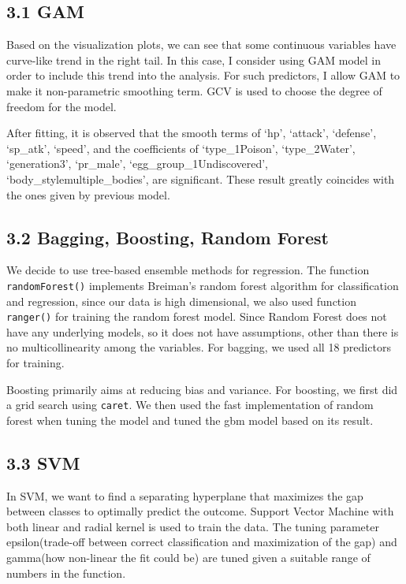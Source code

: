 \documentclass[
]{article}
\begin{document}
\hypertarget{gam}{%
\subsection{3.1 GAM}\label{gam}}

Based on the visualization plots, we can see that some continuous
variables have curve-like trend in the right tail. In this case, I
consider using GAM model in order to include this trend into the
analysis. For such predictors, I allow GAM to make it non-parametric
smoothing term. GCV is used to choose the degree of freedom for the
model.

After fitting, it is observed that the smooth terms of `hp', `attack',
`defense', `sp\_atk', `speed', and the coefficients of `type\_1Poison',
`type\_2Water', `generation3', `pr\_male', `egg\_group\_1Undiscovered',
`body\_stylemultiple\_bodies', are significant. These result greatly
coincides with the ones given by previous model.

\hypertarget{bagging-boosting-random-forest}{%
\subsection{3.2 Bagging, Boosting, Random
Forest}\label{bagging-boosting-random-forest}}

We decide to use tree-based ensemble methods for regression. The
function \texttt{randomForest()} implements Breiman's random forest
algorithm for classification and regression, since our data is high
dimensional, we also used function \texttt{ranger()} for training the
random forest model. \newline Since Random Forest does not have any
underlying models, so it does not have assumptions, other than there is
no multicollinearity among the variables. \newline For bagging, we used
all 18 predictors for training.

Boosting primarily aims at reducing bias and variance. For boosting, we
first did a grid search using \texttt{caret}. We then used the fast
implementation of random forest when tuning the model and tuned the gbm
model based on its result.

\hypertarget{svm}{%
\subsection{3.3 SVM}\label{svm}}

In SVM, we want to find a separating hyperplane that maximizes the gap
between classes to optimally predict the outcome. Support Vector Machine
with both linear and radial kernel is used to train the data. The tuning
parameter epsilon(trade-off between correct classification and
maximization of the gap) and gamma(how non-linear the fit could be) are
tuned given a suitable range of numbers in the function.
\end{document}

